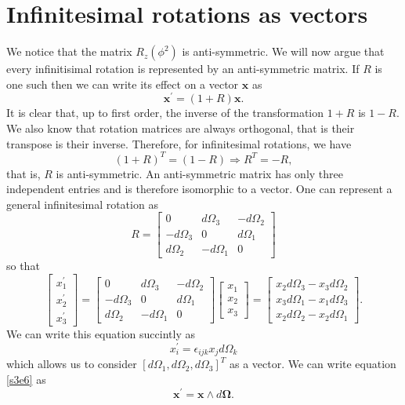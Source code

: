 \documentclass{article}
\numberwithin{equation}{section}
\let\vec\bm
\theoremstyle{plain}
\numberwithin{thm}{section}
\theoremstyle{plain}
\numberwithin{prop}{section}
\theoremstyle{definition}
\numberwithin{defn}{section}
\theoremstyle{remark}
\begin{document}
\section{Infinitesimal rotations as vectors}\label{s3}
We notice that the matrix $R_z(\phi^2)$ is anti-symmetric. We will now argue
that every infinitisimal rotation is represented by an anti-symmetric matrix.
If $R$ is one such then we can write its effect on a vector $\vec{x}$ as
\begin{equation}\label{s3e1}
\vec{x}^\prime = (1 + R)\vec{x}.
\end{equation}
It is clear that, up to first order, the inverse of the transformation $1 + R$
is $1 - R$. We also know that rotation matrices are always orthogonal, that is
their transpose is their inverse. Therefore, for infinitesimal rotations, we
have \cite{wolfram1}
\begin{equation}\label{s3e2}
(1 + R)^T = (1 - R) \Rightarrow R^T = -R,
\end{equation}
that is, $R$ is anti-symmetric. An anti-symmetric matrix has only three
independent entries and is therefore isomorphic to a vector. One can represent
a general infinitesimal rotation as
\begin{equation}\label{s3e3}
R = \begin{bmatrix}0 & d\Omega_3 & -d\Omega_2 \\
-d\Omega_3 & 0 & d\Omega_1 \\
d\Omega_2 & -d\Omega_1 & 0
\end{bmatrix}
\end{equation}
so that 
\begin{equation}\label{s3e4}
\begin{bmatrix}x_1^\prime \\ x_2^\prime \\ x_3^\prime \end{bmatrix} = 
\begin{bmatrix}0 & d\Omega_3 & -d\Omega_2 \\
-d\Omega_3 & 0 & d\Omega_1 \\
d\Omega_2 & -d\Omega_1 & 0
\end{bmatrix}\begin{bmatrix}x_1 \\ x_2 \\ x_3 \end{bmatrix}
= \begin{bmatrix}
x_2d\Omega_3 - x_3d\Omega_2 \\
x_3d\Omega_1 - x_1d\Omega_3 \\
x_2d\Omega_2 - x_2d\Omega_1
\end{bmatrix}.
\end{equation}
We can write this equation succintly as
\begin{equation}\label{s3e5}
x_i^\prime = \epsilon_{ijk}x_jd\Omega_k
\end{equation}
which allows us to consider $[d\Omega_1, d\Omega_2, d\Omega_3]^T$ as a vector.
We can write equation \eqref{s3e6} as
\begin{equation}\label{s3e6}
\vec{x}^\prime = \vec{x} \wedge d\vec{\Omega}.
\end{equation}
\end{document}
